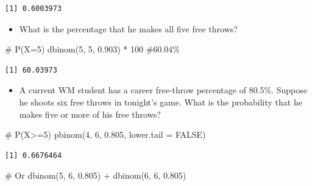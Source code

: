 \documentclass[
  letterpaper,
  DIV=11,
  numbers=noendperiod]{scrreprt}
\newenvironment{Shaded}{\begin{snugshade}}{\end{snugshade}}
\newcommand{\AttributeTok}[1]{\textcolor[rgb]{0.40,0.45,0.13}{#1}}
\newcommand{\CommentTok}[1]{\textcolor[rgb]{0.37,0.37,0.37}{#1}}
\newcommand{\ConstantTok}[1]{\textcolor[rgb]{0.56,0.35,0.01}{#1}}
\newcommand{\DecValTok}[1]{\textcolor[rgb]{0.68,0.00,0.00}{#1}}
\newcommand{\FloatTok}[1]{\textcolor[rgb]{0.68,0.00,0.00}{#1}}
\newcommand{\FunctionTok}[1]{\textcolor[rgb]{0.28,0.35,0.67}{#1}}
\newcommand{\NormalTok}[1]{\textcolor[rgb]{0.00,0.23,0.31}{#1}}
\newcommand{\SpecialCharTok}[1]{\textcolor[rgb]{0.37,0.37,0.37}{#1}}
\providecommand{\tightlist}{%
  \setlength{\itemsep}{0pt}\setlength{\parskip}{0pt}}\usepackage{longtable,booktabs,array}
\begin{document}
\begin{verbatim}
[1] 0.6003973
\end{verbatim}

\begin{itemize}
\tightlist
\item
  What is the percentage that he makes all five free throws?
\end{itemize}

\begin{Shaded}
\begin{Highlighting}[]
\CommentTok{\# P(X=5)}
\FunctionTok{dbinom}\NormalTok{(}\DecValTok{5}\NormalTok{, }\DecValTok{5}\NormalTok{, }\FloatTok{0.903}\NormalTok{) }\SpecialCharTok{*} \DecValTok{100}  \CommentTok{\#60.04\%}
\end{Highlighting}
\end{Shaded}

\begin{verbatim}
[1] 60.03973
\end{verbatim}

\begin{itemize}
\tightlist
\item
  A current WM student has a career free-throw percentage of 80.5\%.
  Suppose he shoots six free throws in tonight's game. What is the
  probability that he makes five or more of his free throws?
\end{itemize}

\begin{Shaded}
\begin{Highlighting}[]
\CommentTok{\# P(X\textgreater{}=5)}
\FunctionTok{pbinom}\NormalTok{(}\DecValTok{4}\NormalTok{, }\DecValTok{6}\NormalTok{, }\FloatTok{0.805}\NormalTok{, }\AttributeTok{lower.tail =} \ConstantTok{FALSE}\NormalTok{)}
\end{Highlighting}
\end{Shaded}

\begin{verbatim}
[1] 0.6676464
\end{verbatim}

\begin{Shaded}
\begin{Highlighting}[]
\CommentTok{\# Or}
\FunctionTok{dbinom}\NormalTok{(}\DecValTok{5}\NormalTok{, }\DecValTok{6}\NormalTok{, }\FloatTok{0.805}\NormalTok{) }\SpecialCharTok{+} \FunctionTok{dbinom}\NormalTok{(}\DecValTok{6}\NormalTok{, }\DecValTok{6}\NormalTok{, }\FloatTok{0.805}\NormalTok{)}
\end{Highlighting}
\end{Shaded}
\end{document}
